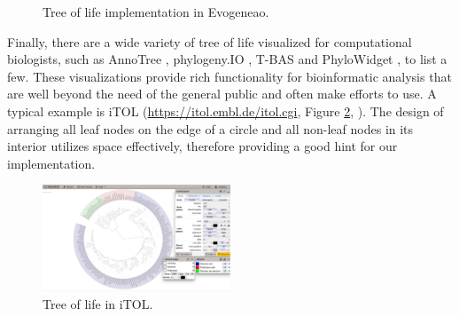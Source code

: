 \documentclass[11pt, a4paper,oneside,chapterprefix=false]{scrbook}
\begin{document}
\begin{figure}[h]
	\centering
	\hfill
	\caption{Tree of life implementation in Evogeneao. }
	\label{fig:evogeneao}
\end{figure}

Finally, there are a wide variety of tree of life visualized for computational biologists, such as AnnoTree \cite{mendler2019annotree}, phylogeny.IO \cite{jovanovic2019interactive}, T-BAS \cite{carbone2017t} and PhyloWidget \cite{jordan2008phylowidget}, to list a few. These visualizations provide rich functionality for bioinformatic analysis that are well beyond the need of the general public and often make efforts to use. A typical example is iTOL (\url{https://itol.embl.de/itol.cgi}, Figure \ref{fig:iTOL}, \cite{letunic2019interactive}). The design of arranging all leaf nodes on the edge of a circle and all non-leaf nodes in its interior utilizes space effectively, therefore providing a good hint for our implementation.\\

\begin{figure}[h]
	\centering
	\includegraphics[width=0.5\textwidth]{figures/related_work/iTOL}
	\caption{Tree of life in iTOL. }
	\label{fig:iTOL}
\end{figure}
\end{document}

